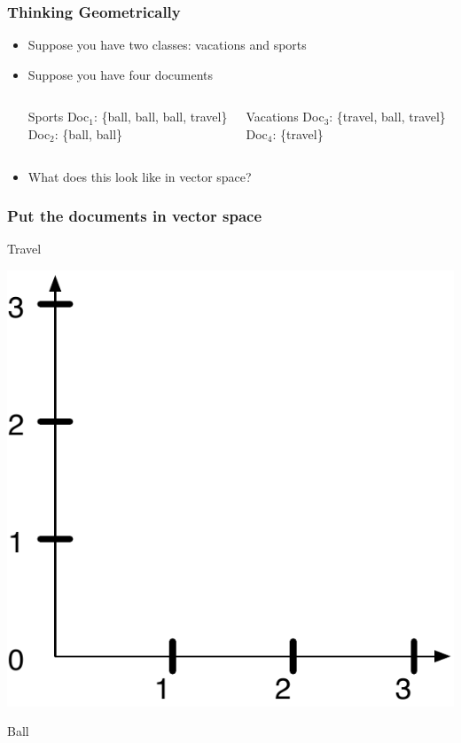 \documentclass[compress]{beamer}
\newcommand{\1}{\mathbf{1}}
\begin{document}
\begin{frame}

  \frametitle{Thinking Geometrically}

  \begin{itemize}
    \item Suppose you have two classes: vacations and sports
    \item Suppose you have four documents

\begin{columns}

    \begin{block}{Sports}
    Doc$_1$: \{ball, ball, ball, travel\} \\
    Doc$_2$: \{ball, ball\}
    \end{block}


    \begin{block}{Vacations}
    Doc$_3$: \{travel, ball, travel\} \\
    Doc$_4$: \{travel\}
    \end{block}

\end{columns}

\item What does this look like in vector space?

  \end{itemize}

\end{frame}

\begin{frame}
  \frametitle{Put the documents in vector space}

\large Travel
\centerline{ \includegraphics[width=.5\linewidth]{svm/ex_geom_axes} }
\flushright \large Ball

\end{frame}
\end{document}
